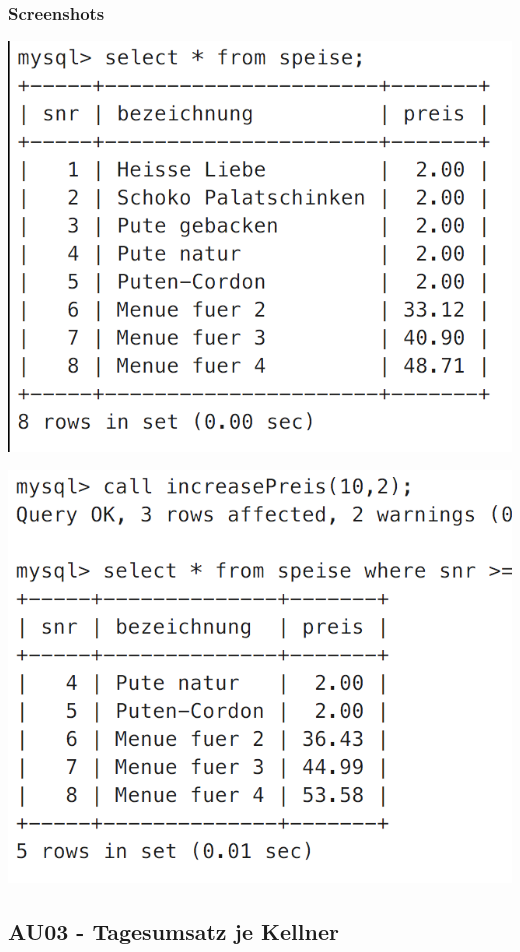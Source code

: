 \subsubsection{Screenshots}
\vspace{0.2cm}
\begin{minipage}{.5\textwidth}
	\includegraphics[width=0.9\linewidth]{images/s03.png}
\end{minipage}%
\begin{minipage}{.5\textwidth}
	\includegraphics[width=0.9\linewidth]{images/s04.png}
\end{minipage}

\clearpage

\subsection{AU03 - Tagesumsatz je Kellner}
